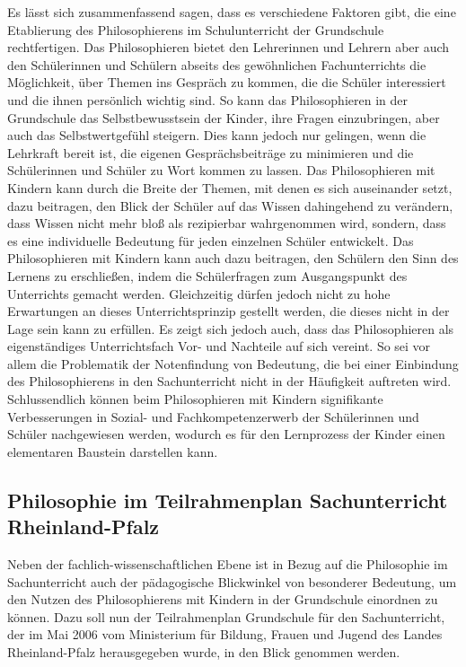 Es lässt sich zusammenfassend sagen, dass es verschiedene Faktoren gibt, die eine Etablierung des Philosophierens im Schulunterricht der Grundschule rechtfertigen. 
Das Philosophieren bietet den Lehrerinnen und Lehrern aber auch den Schülerinnen und Schülern abseits des gewöhnlichen Fachunterrichts die Möglichkeit, über Themen ins Gespräch zu kommen, die die Schüler interessiert und die ihnen persönlich wichtig sind. 
So kann das Philosophieren in der Grundschule das Selbstbewusstsein der Kinder, ihre Fragen einzubringen, aber auch das Selbstwertgefühl steigern. 
Dies kann jedoch nur gelingen, wenn die Lehrkraft bereit ist, die eigenen Gesprächsbeiträge zu minimieren und die Schülerinnen und Schüler zu Wort kommen zu lassen.
Das Philosophieren mit Kindern kann durch die Breite der Themen, mit denen es sich auseinander setzt, dazu beitragen, den Blick der Schüler auf das Wissen dahingehend zu verändern, dass Wissen nicht mehr bloß als rezipierbar wahrgenommen wird, sondern, dass es eine individuelle Bedeutung für jeden einzelnen Schüler entwickelt.
Das Philosophieren mit Kindern kann auch dazu beitragen, den Schülern den Sinn des Lernens zu erschließen, indem die Schülerfragen zum Ausgangspunkt des Unterrichts gemacht werden.
Gleichzeitig dürfen jedoch nicht zu hohe Erwartungen an dieses Unterrichtsprinzip gestellt werden, die dieses nicht in der Lage sein kann zu erfüllen. 
Es zeigt sich jedoch auch, dass das Philosophieren als eigenständiges Unterrichtsfach Vor- und Nachteile auf sich vereint.
So sei vor allem die Problematik der Notenfindung von Bedeutung, die bei einer Einbindung des Philosophierens in den Sachunterricht nicht in der Häufigkeit auftreten wird.
Schlussendlich können beim Philosophieren mit Kindern signifikante Verbesserungen in Sozial- und Fachkompetenzerwerb der Schülerinnen und Schüler nachgewiesen werden, wodurch es für den Lernprozess der Kinder einen elementaren Baustein darstellen kann.

\newpage
\subsection{Philosophie im Teilrahmenplan Sachunterricht Rheinland-Pfalz}

Neben der fachlich-wissenschaftlichen Ebene ist in Bezug auf die Philosophie im Sachunterricht auch der pädagogische Blickwinkel von besonderer Bedeutung, um den Nutzen des Philosophierens mit Kindern in der Grundschule einordnen zu können. 
Dazu soll nun der Teilrahmenplan Grundschule für den Sachunterricht, der im Mai 2006 vom Ministerium für Bildung, Frauen und Jugend des Landes Rheinland-Pfalz herausgegeben wurde, in den Blick genommen werden. 

